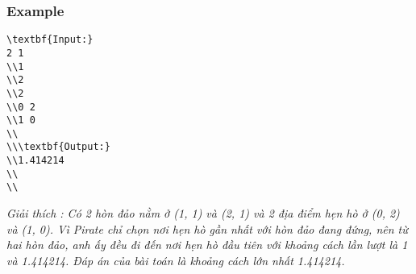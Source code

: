 \subsubsection{   Example  }
\begin{verbatim}
\textbf{Input:}
2 1 
\\1 
\\2
\\2
\\0 2
\\1 0
\\
\\\textbf{Output:}
\\1.414214
\\
\\\end{verbatim}



\emph{     Giải thích        : Có 2 hòn đảo nằm ở (1, 1) và (2, 1) và 2 địa điểm hẹn hò ở (0, 2) và (1, 0). Vì Pirate chỉ chọn nơi hẹn hò gần nhất với hòn đảo đang đứng, nên từ hai hòn đảo, anh ấy đều đi đến nơi hẹn hò đầu tiên với khoảng cách lần lượt là 1 và 1.414214. Đáp án của bài toán là khoảng cách lớn nhất 1.414214.    
\\}